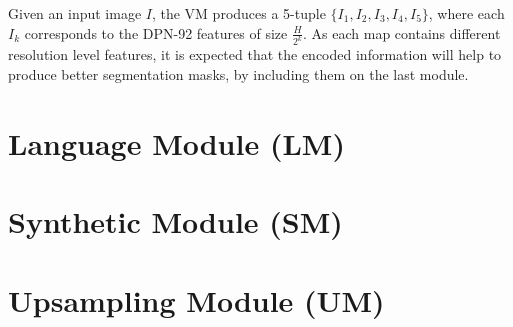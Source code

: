 Given an input image $I$, the VM produces a 5-tuple $\{I_1, I_2, I_3, I_4, I_5\}$, where each $I_k$ corresponds to the DPN-92 features of size $\frac{H}{2^k}$. As each map contains different resolution level features, it is expected that the encoded information will help to produce better segmentation masks, by including them on the last module.


\section{Language Module (LM)}



\section{Synthetic Module (SM)}


\section{Upsampling Module (UM)}
\label{section:um}